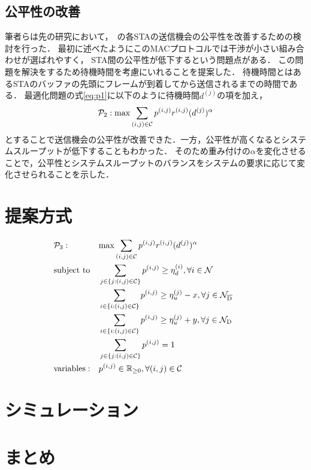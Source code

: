 \documentclass[technicalreport]{ieicej}
\begin{document}
	\subsection{公平性の改善}\label{sec:fair}
		筆者らは先の研究において，~\cite{promac}の各STAの送信機会の公平性を改善するための検討を行った．
		最初に述べたようにこのMACプロトコルでは干渉が小さい組み合わせが選ばれやすく，
		STA間の公平性が低下するという問題点がある．
		この問題を解決をするため待機時間を考慮にいれることを提案した．
		待機時間とはあるSTAのバッファの先頭にフレームが到着してから送信されるまでの時間である．
		最適化問題の式\eqref{eq:p1}に以下のように待機時間$d^{(j)}$の項を加え，
		\begin{equation}
			{\mathcal P}_2: {\rm max} \sum_{(i,j)\in{\mathcal C}} p^{(i,j)}r^{(i,j)}(d^{(j)})^{\alpha} \label{eq:p2}
		\end{equation}
		とすることで送信機会の公平性が改善できた．一方，公平性が高くなるとシステムスループットが低下することもわかった．
		そのため重み付けの$\alpha$を変化させることで，公平性とシステムスループットのバランスをシステムの要求に応じて変化させられることを示した．

\section{提案方式}
\begin{align}
	&{\mathcal P}_3: && {\rm max} \sum_{(i,j)\in{\mathcal C}} p^{(i,j)}r^{(i,j)}(d^{(j)})^{\alpha} &&&&&&\\
	&{\rm subject\ to} && \sum_{j\in\{j:(i,j)\in{\mathcal C}\}} p^{(i,j)} \geq \eta_d^{(i)}, \forall i\in {\mathcal N}  \\
	&&& \sum_{i\in\{i:(i,j)\in{\mathcal C}\}} p^{(i,j)} \geq \eta_u^{(j)}-x, \forall j\in {\mathcal N}_{\rm {\overline D}}  \\
	&&& \sum_{i\in\{i:(i,j)\in{\mathcal C}\}} p^{(i,j)} \geq \eta_u^{(j)}+y, \forall j\in {\mathcal N}_{\rm D}  \\
	&&& \sum_{j\in\{j:(i,j)\in{\mathcal C}\}} p^{(i,j)}=1 \\
	&{\rm variables:} &&p^{(i,j)} \in {\mathbb R}_{\geq 0},\forall(i,j)\in {\mathcal C}
\end{align}


\section{シミュレーション}


\section{まとめ}



\end{document}
